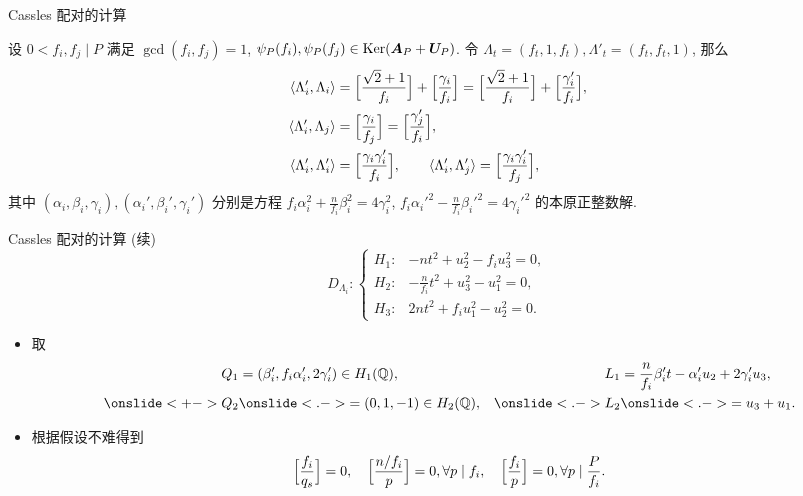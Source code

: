 \documentclass[aspectratio=169]{ctexbeamer}
\renewcommand\aleg[2]{\Bigl[\dfrac{{#1}}{#2}\Bigr]}
\begin{document}
\begin{frame}{Cassles 配对的计算}
	\onslide<+->
	\begin{proposition}
		设 $0<f_i,f_j\mid P$ 满足 $\gcd(f_i,f_j)=1$, $\psi_P(f_i),\psi_P(f_j)\in \operatorname{Ker}({\boldsymbol{A}}_P+{\boldsymbol{U}}_P)$.
		令 $\Lambda_t=(f_t,1,f_t), \Lambda'_t=(f_t,f_t,1)$,
		那么
		\begin{align*}
			\pair{\Lambda_i',\Lambda_i}&=\aleg{\sqrt2+1}{f_i}+\aleg{\gamma_i}{f_i}=\aleg{\sqrt2+1}{f_i}+\aleg{\gamma_i'}{f_i},\\
			\pair{\Lambda_i',\Lambda_j}&=\aleg{\gamma_i}{f_j}=\aleg{\gamma_j'}{f_i},\\
			\pair{\Lambda_i',\Lambda_i'}&=\aleg{\gamma_i\gamma_i'}{f_i},\qquad
			\pair{\Lambda_i',\Lambda_j'}=\aleg{\gamma_i\gamma_i'}{f_j},
		\end{align*}
		其中 $(\alpha_i,\beta_i,\gamma_i),(\alpha_i',\beta_i',\gamma_i')$ 分别是方程 $f_i\alpha_i^2+\frac n{f_i}\beta_i^2=4\gamma_i^2$, $f_i\alpha_i'^2-\frac n{f_i}\beta_i'^2=4\gamma_i'^2$ 的本原正整数解.
	\end{proposition}
\end{frame}


\begin{frame}{Cassles 配对的计算 (续)}
	\onslide<+->
	\[
		D_{\Lambda_i}:
		\begin{cases}
			H_1:& -nt^2+u_2^2-f_i u_3^2=0,\\
			H_2:& -\frac n{f_i} t^2+u_3^2-u_1^2=0,\\
			H_3:& 2nt^2+f_i u_1^2-u_2^2=0.
		\end{cases}
	\]
	\begin{itemize}
		\item 取
		\begin{align*}
			Q_1&=(\beta_i',f_i\alpha_i',2\gamma_i')\in H_1(\BQ),&
			L_1&=\frac{n}{f_i}\beta_i' t-\alpha_i' u_2+2\gamma_i' u_3,\\
			\onslide<+->{Q_2}&\onslide<.->{=(0,1,-1)\in H_2(\BQ),}&
			\onslide<.->{L_2}&\onslide<.->{=u_3+u_1.}
		\end{align*}
		\item 根据假设不难得到
		\[
			\aleg{f_i}{q_s}=0,\quad
			\aleg{n/f_i}{p}=0,\forall p\mid f_i,\quad
			\aleg{f_i}{p}=0,\forall p\mid \frac{P}{f_i}.
		\]
	\end{itemize}
\end{frame}
\end{document}
